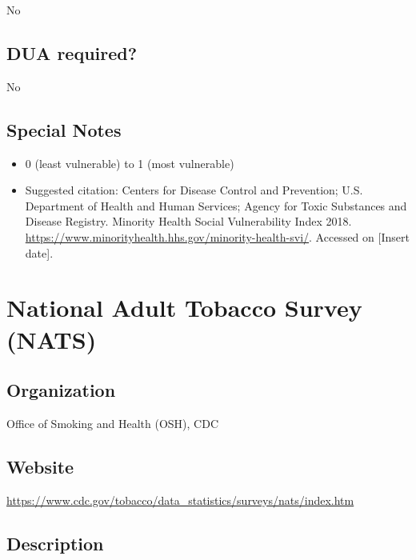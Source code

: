 \documentclass[
]{book}
\providecommand{\tightlist}{%
  \setlength{\itemsep}{0pt}\setlength{\parskip}{0pt}}
\begin{document}
No

\hypertarget{dua-required-41}{%
\section{DUA required?}\label{dua-required-41}}

No

\hypertarget{special-notes-41}{%
\section{Special Notes}\label{special-notes-41}}

\begin{itemize}
\tightlist
\item
  0 (least vulnerable) to 1 (most vulnerable)
\item
  Suggested citation: Centers for Disease Control and Prevention; U.S. Department of Health and Human Services; Agency for Toxic Substances and Disease Registry. Minority Health Social Vulnerability Index 2018. \url{https://www.minorityhealth.hhs.gov/minority-health-svi/}. Accessed on {[}Insert date{]}.
\end{itemize}

\mainmatter

\hypertarget{national-adult-tobacco-survey-nats}{%
\chapter{National Adult Tobacco Survey (NATS)}\label{national-adult-tobacco-survey-nats}}

\hypertarget{organization-42}{%
\section{Organization}\label{organization-42}}

Office of Smoking and Health (OSH), CDC

\hypertarget{website-42}{%
\section{Website}\label{website-42}}

\url{https://www.cdc.gov/tobacco/data_statistics/surveys/nats/index.htm}

\hypertarget{description-42}{%
\section{Description}\label{description-42}}
\end{document}
